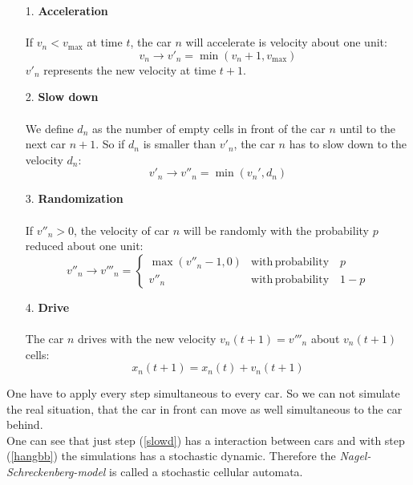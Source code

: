 \documentclass[11pt]{article}
\begin{document}
\begin{itemize}
\item[1.]	\textbf{Acceleration}\\
\\
If $v_n<v_{\mathrm{max}}$ at time $t$, the car $n$ will accelerate is velocity about one unit:
\begin{equation}
v_n \rightarrow v'_n = \min(v_n+1,v_\mathrm{max})
\label{accel}
\end{equation}
$v'_n$ represents the new velocity at time $t+1$.
\item[2.]  \textbf{Slow down}\\
\\
We define $d_n$ as the number of empty cells in front of the car $n$ until to the next car $n+1$. So if $d_n$ is smaller than $v'_n$, the car $n$ has to slow down to the velocity $d_n$:
\begin{equation}
v'_n \rightarrow v''_n = \min(v_n',d_n)
\label{slowd}
\end{equation}
\item[3.]  \textbf{Randomization}\\
\\
If $v''_n>0$, the velocity of car $n$ will be randomly with the probability $p$ reduced about one unit:
\begin{equation}
v''_n \rightarrow v'''_n=
\begin{cases}
\max(v''_n-1,0) & \mathrm{with\,probability} \quad p\\
v''_n & \mathrm{with\,probability} \quad 1-p
\end{cases}
\label{hangbb}
\end{equation}
\item[4.] \textbf{Drive}\\
\\
The car $n$ drives with the new velocity $v_n(t+1)=v'''_n$ about $v_n(t+1)$ cells:
\begin{equation}
x_n(t+1)=x_n(t)+v_n(t+1)
\label{drive}
\end{equation}
\end{itemize}
One have to apply every step simultaneous to every car. So we can not simulate the real situation, that the car in front can move as well simultaneous to the car behind.
\\
One can see that just step (\ref{slowd}) has a interaction between cars and with step (\ref{hangbb}) the simulations has a stochastic  dynamic. Therefore the \textit{Nagel-Schreckenberg-model} is called a stochastic cellular automata.\\
\end{document}
